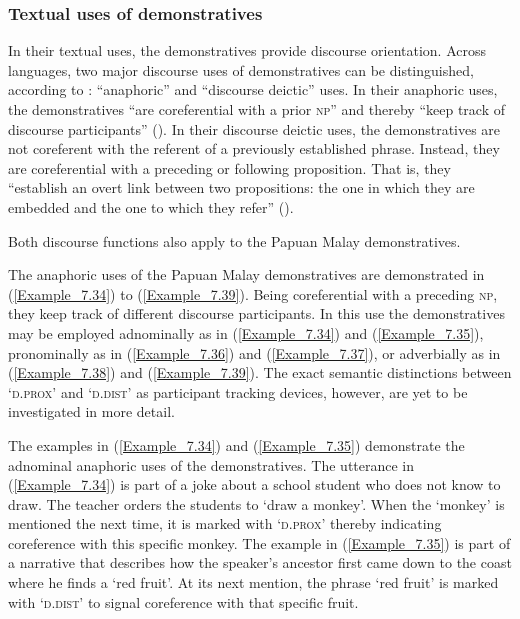 {\subsubsection[Textual uses of demonstratives]{Textual uses of demonstratives}
\label{Para_7.1.2.5}
In their textual uses, the demonstratives provide discourse orientation. Across languages, two major discourse uses of demonstratives can be distinguished, according to \citet[95–105]{Diessel.1999}: “anaphoric” and “discourse deictic” uses. In their anaphoric uses, the demonstratives “are coreferential with a prior \textsc{np}” and thereby “keep track of discourse participants” (\citeyear*[93]{Diessel.1999}). In their discourse deictic uses, the demonstratives are not coreferent with the referent of a previously established  phrase. Instead, they are coreferential with a preceding or following proposition. That is, they “establish an overt link between two propositions: the one in which they are embedded and the one to which they refer” (\citeyear*[101]{Diessel.1999}). \citep[See also][]{Himmelmann.1996}



Both discourse functions also apply to the Papuan Malay demonstratives.



The anaphoric uses of the Papuan Malay demonstratives are demonstrated in (\ref{Example_7.34}) to (\ref{Example_7.39}). Being coreferential with a preceding \textsc{np}, they keep track of different discourse participants. In this use the demonstratives may be employed adnominally as in (\ref{Example_7.34}) and (\ref{Example_7.35}), pronominally as in (\ref{Example_7.36}) and (\ref{Example_7.37}), or adverbially as in (\ref{Example_7.38}) and (\ref{Example_7.39}). The exact semantic distinctions between  ‘\textsc{d.prox}’ and  ‘\textsc{d.dist}’ as participant tracking devices, however, are yet to be investigated in more detail.



The examples in (\ref{Example_7.34}) and (\ref{Example_7.35}) demonstrate the adnominal anaphoric uses of the demonstratives. The utterance in (\ref{Example_7.34}) is part of a joke about a school student who does not know to draw. The teacher orders the students to  ‘draw a monkey’. When the  ‘monkey’ is mentioned the next time, it is marked with  ‘\textsc{d.prox}’ thereby indicating coreference with this specific monkey. The example in (\ref{Example_7.35}) is part of a narrative that describes how the speaker’s ancestor first came down to the coast where he finds a  ‘red fruit’. At its next mention, the  phrase  ‘red fruit’ is marked with  ‘\textsc{d.dist}’ to signal coreference with that specific fruit.


}
